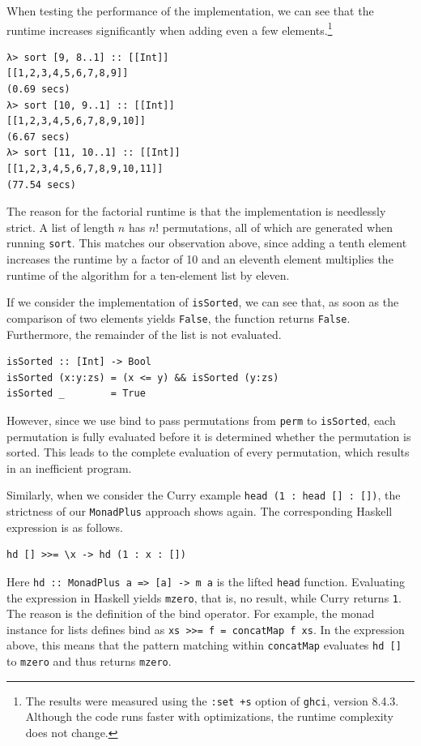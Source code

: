 \documentclass[a4paper, 11pt, fleqn, twoside, abstract=on]{scrreprt}
\newcommand{\hinl}[1]{\texttt{#1}}
\begin{document}
When testing the performance of the implementation, we can see that the runtime increases significantly when adding even a few elements.\footnote{The results were measured using the \texttt{:set +s} option of \texttt{ghci}, version 8.4.3. Although the code runs faster with optimizations, the runtime complexity does not change.}

\begin{verbatim}
λ> sort [9, 8..1] :: [[Int]]
[[1,2,3,4,5,6,7,8,9]]
(0.69 secs)
λ> sort [10, 9..1] :: [[Int]]
[[1,2,3,4,5,6,7,8,9,10]]
(6.67 secs)
λ> sort [11, 10..1] :: [[Int]]
[[1,2,3,4,5,6,7,8,9,10,11]]
(77.54 secs)
\end{verbatim}

The reason for the factorial runtime is that the implementation is needlessly strict.
A list of length $n$  has $n!$ permutations, all of which are generated when running \hinl{sort}.
This matches our observation above, since adding a tenth element increases the runtime by a factor of 10 and an eleventh element multiplies the runtime of the algorithm for a ten-element list by eleven.

If we consider the implementation of \hinl{isSorted}, we can see that, as soon as the comparison of two elements yields \hinl{False}, the function returns \hinl{False}.
Furthermore, the remainder of the list is not evaluated.

\begin{verbatim}
isSorted :: [Int] -> Bool
isSorted (x:y:zs) = (x <= y) && isSorted (y:zs)
isSorted _        = True
\end{verbatim}
\noindent
However, since we use bind to pass permutations from \hinl{perm} to \hinl{isSorted}, each permutation is fully evaluated before it is determined whether the permutation is sorted.
This leads to the complete evaluation of every permutation, which results in an inefficient program.

Similarly, when we consider the Curry example \hinl{head (1 : head [] : [])}, the strictness of our \hinl{MonadPlus} approach shows again.
The corresponding Haskell expression is as follows.

\begin{verbatim}
hd [] >>= \x -> hd (1 : x : [])
\end{verbatim}
\noindent
Here \hinl{hd :: MonadPlus a => [a] -> m a} is the lifted \hinl{head} function.
Evaluating the expression in Haskell yields \hinl{mzero}, that is, no result, while Curry returns \hinl{1}.
The reason is the definition of the bind operator.
For example, the monad instance for lists defines bind as \hinl{xs >>= f = concatMap f xs}.
In the expression above, this means that the pattern matching within \hinl{concatMap} evaluates \hinl{hd []} to \hinl{mzero} and thus returns \hinl{mzero}.
\end{document}
